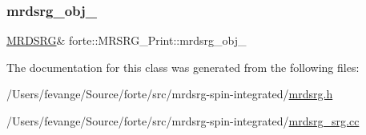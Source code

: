 \mbox{\label{classforte_1_1_m_r_s_r_g___print_a3bb9c5679b54dc70c465d07719206d7b}} 
\subsubsection{\texorpdfstring{mrdsrg\+\_\+obj\+\_\+}{mrdsrg\_obj\_}}
{\footnotesize\ttfamily \mbox{\hyperlink{classforte_1_1_m_r_d_s_r_g}{M\+R\+D\+S\+RG}}\& forte\+::\+M\+R\+S\+R\+G\+\_\+\+Print\+::mrdsrg\+\_\+obj\+\_\+\hspace{0.3cm}{\ttfamily [protected]}}



The documentation for this class was generated from the following files\+:\begin{DoxyCompactItemize}
\item 
/\+Users/fevange/\+Source/forte/src/mrdsrg-\/spin-\/integrated/\mbox{\hyperlink{mrdsrg_8h}{mrdsrg.\+h}}\item 
/\+Users/fevange/\+Source/forte/src/mrdsrg-\/spin-\/integrated/\mbox{\hyperlink{mrdsrg__srg_8cc}{mrdsrg\+\_\+srg.\+cc}}\end{DoxyCompactItemize}
